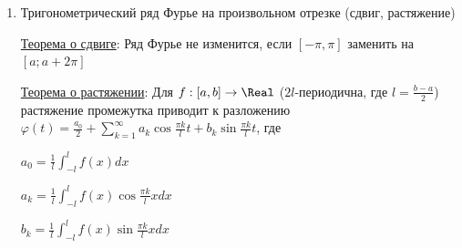 \begin{enumerate}
    $\frac{a_0}{2} = \frac{1}{2\pi} \int_{-\pi}^\pi f(x) dx$ 
    
    $a_k = \frac{1}{\pi} \int_{-\pi}^\pi f(x) \cos kx dx$
    
    $b_k = \frac{1}{\pi} \int_{-\pi}^\pi f(x) \sin kx dx$

    \hyperlink{dirichletstheorem}{Теорема Дирихле}:

    \Ths $f(x)$ -- $2\pi$-периодична, на $[-\pi, \pi]$ $f(x)$ -- кусочно монотонна и ограничена (то есть имеет конечное число конечных разрывов). 
    Тогда в точках непрерывности $f(x)$ представляется рядом Фурье $S(x) = \frac{a_0}{2} + \sum_{n = 1}^\infty (a_n \cos nx + b_n \sin nx)$,
    а в точках разрыва $x_0$ $S(x_0) = \frac{1}{2} (f(x_0 + 0) + f(x_0 - 0))$

    \item Тригонометрический ряд Фурье на произвольном отрезке (сдвиг, растяжение)

    \hyperlink{shifttheorem}{Теорема о сдвиге}:  Ряд Фурье не изменится, если $[-\pi, \pi]$ заменить на $[a; a + 2\pi]$

    \hyperlink{stretchingtheorem}{Теорема о растяжении}:  Для $f : [a, b] \to \Real$ ($2l$-периодична, где $l = \frac{b - a}{2}$) растяжение промежутка приводит к разложению
    $\varphi(t) = \frac{a_0}{2} + \sum_{k = 1}^\infty a_k \cos \frac{\pi k}{l} t + b_k \sin \frac{\pi k}{l} t$, где

    $a_0 = \frac{1}{l} \int_{-l}^l f(x) dx$

    $a_k = \frac{1}{l} \int_{-l}^l f(x) \cos \frac{\pi k}{l} x dx$

    $b_k = \frac{1}{l} \int_{-l}^l f(x) \sin \frac{\pi k}{l} x dx$

\end{enumerate}